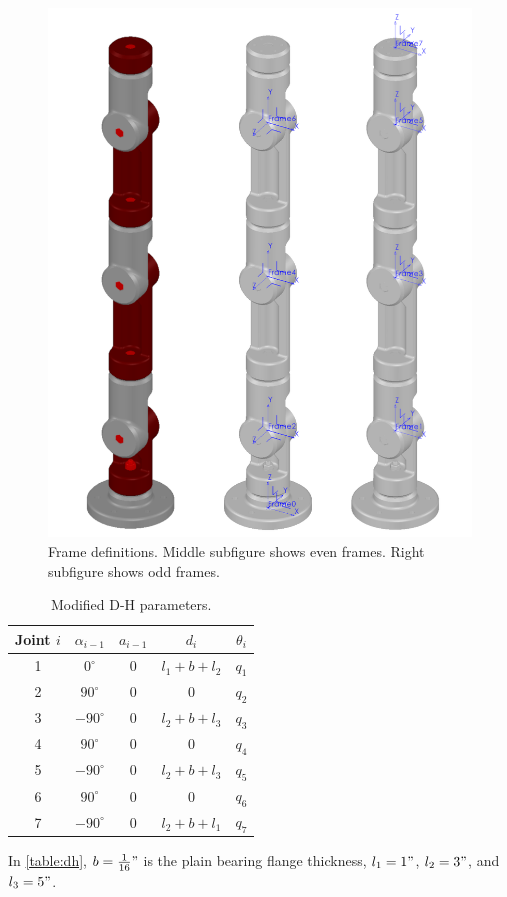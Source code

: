 \documentclass{article}
\begin{document}
\begin{figure}[h]
  \centering
  \includegraphics[height=0.5\linewidth]{dhFrames}
  \caption{Frame definitions. Middle subfigure shows even frames. Right subfigure shows odd frames.}
  \label{fig:frames}
\end{figure}

\begin{table}[h]
\begin{center}
\caption{Modified D-H parameters.}
\label{table:dh}
\begin{tabular}{|c c c c c|}
  \hline
  Joint $i$ & $\alpha_{i-1}$ & $a_{i-1}$ & $d_i$ & $\theta_i$ \\
  \hline
  1 & $0^\circ$ & 0 & $l_1 + b + l_2$ & $q_1$ \\
  2 & $90^\circ$ & 0 & 0 & $q_2$ \\
  3 & $-90^\circ$ & 0 & $l_2 + b + l_3$ & $q_3$ \\
  4 & $90^\circ$ & 0 & 0 & $q_4$ \\
  5 & $-90^\circ$ & 0 & $l_2 + b + l_3$ & $q_5$ \\
  6 & $90^\circ$ & 0 & 0 & $q_6$ \\
  7 & $-90^\circ$ & 0 & $l_2 + b + l_1$ & $q_7$ \\
  \hline
\end{tabular}
\end{center}
\end{table}
In \autoref{table:dh}, $b = \frac{1}{16}"$ is the plain bearing flange thickness,
$l_1 = 1"$, $l_2 = 3"$, and $l_3 = 5"$.
\end{document}
